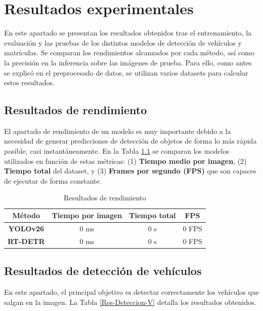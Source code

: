 \documentclass[12pt,a4paper,onecolumn,oneside]{report}
\begin{document}
\chapter{Resultados experimentales}
\label{Resultados experimentales}

En este apartado se presentan los resultados obtenidos tras el entrenamiento, la evaluación y las pruebas de los distintos modelos de detección de vehículos y matrículas. Se comparan los rendimientos alcanzados por cada método, así como la precisión en la inferencia sobre las imágenes de prueba. Para ello, como antes se explicó en el preprocesado de datos, se utilizan varios datasets para calcular estos resultados.

\section{Resultados de rendimiento}

El apartado de rendimiento de un modelo es muy importante debido a la necesidad de generar predicciones de detección de objetos de forma lo más rápida posible, casi instantáneamente. En la Tabla \ref{Res-Rendimiento} se comparan los modelos utilizados en función de estas métricas: (1) \textbf{Tiempo medio por imagen}, (2) \textbf{Tiempo total} del dataset, y (3) \textbf{Frames por segundo (FPS)} que son capaces de ejecutar de forma constante.

\begin{table}[ht]
    \centering
    \caption{Resultados de rendimiento} %
    \begin{tabular}{|c|c|c|c|}
        \hline
        \textbf{Método} & \textbf{Tiempo por imagen} & \textbf{Tiempo total} & \textbf{FPS}\\
        \hline
        \textbf{YOLOv26} & 0 ms & 0 s & 0 FPS\\
        \hline
        \textbf{RT-DETR} & 0 ms & 0 s & 0 FPS\\
        \hline
    \end{tabular}
    \label{Res-Rendimiento}
\end{table}


\section{Resultados de detección de vehículos} %

En este apartado, el principal objetivo es detectar correctamente los vehículos que salgan en la imagen. La Tabla \ref{Res-Deteccion-V} detalla los resultados obtenidos.
\end{document}
